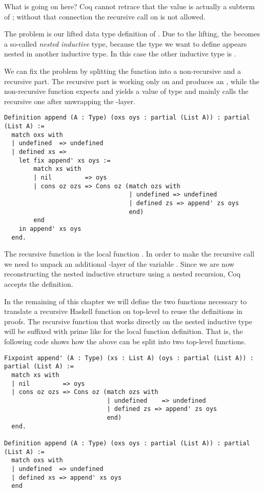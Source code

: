 What is going on here?
Coq cannot retrace that the value  is actually a
subterm of ; without that connection the
recursive call on  is not allowed.

The problem is our lifted data type definition of
.
Due to the lifting, the  becomes a so-called
\emph{nested inductive} type, because the type we want to define
appears nested in another inductive type.
In this case the other inductive type is .

We can fix the problem by splitting the function into a non-recursive
and a recursive part.
The recursive part is working only on  and
produces an , while the non-recursive
function expects and yields a value of type  and mainly calls the recursive one after unwrapping the
-layer.

\begin{verbatim}
Definition append (A : Type) (oxs oys : partial (List A)) : partial (List A) :=
  match oxs with
  | undefined  => undefined
  | defined xs =>
    let fix append' xs oys :=
        match xs with
        | nil         => oys
        | cons oz ozs => Cons oz (match ozs with
                                  | undefined => undefined
                                  | defined zs => append' zs oys
                                  end)
        end
    in append' xs oys
  end.
\end{verbatim}

The recursive function is the local function
.
In order to make the recursive call we need to unpack an additional
-layer of the variable .
Since we are now reconstructing the nested inductive structure using a
nested recursion, Coq accepts the definition.

In the remaining of this chapter we will define the two functions
necessary to translate a recursive Haskell function on top-level to
reuse the definitions in proofs.
The recursive function that works directly on the nested inductive
type will be suffixed with prime like for the local function definition.
That is, the following code shows how the above can be split into two
top-level functions.

\begin{verbatim}
Fixpoint append' (A : Type) (xs : List A) (oys : partial (List A)) : partial (List A) :=
  match xs with
  | nil         => oys
  | cons oz ozs => Cons oz (match ozs with
                            | undefined    => undefined
                            | defined zs => append' zs oys
                            end)
  end.

Definition append (A : Type) (oxs oys : partial (List A)) : partial (List A) :=
  match oxs with
  | undefined  => undefined
  | defined xs => append' xs oys
  end
\end{verbatim}

